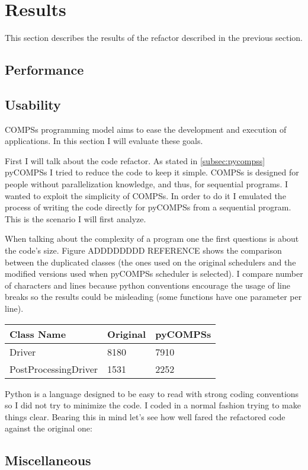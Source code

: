 \chapter{Results}


This section describes the results of the refactor described in the previous section. 
\section{Performance}



\section{Usability}

COMPSs programming model aims to ease the development and execution of applications. In this section I will evaluate these goals.

First I will talk about the code refactor. As stated in \ref{subsec:pycompss} pyCOMPSs I tried to reduce the code to keep it simple. COMPSs is designed for people without parallelization knowledge, and thus, for sequential programs. I wanted to exploit the simplicity of COMPSs. In order to do it I emulated the process of writing the code directly for pyCOMPSs from a sequential program. This is the scenario I will first analyze.

When talking about the complexity of a program one the first questions is about the code's size. Figure ADDDDDDDD REFERENCE shows the comparison between the duplicated classes (the ones used on the original schedulers and the modified versions used when pyCOMPSs scheduler is selected). I compare number of characters and lines because python conventions encourage the usage of line breaks so the results could be misleading (some functions have one parameter per line).


\begin{center}
	\begin{tabular}{| R{3cm} | C{3cm} | C{3cm} |}
		\hline
		Class Name & Original & pyCOMPSs \\ 
		\hline
		\hline
		Driver & 8180  &  7910 \\
		PostProcessingDriver & 1531 & 2252 \\
		
		\hline
	\end{tabular}
\end{center}


Python is a language designed to be easy to read with strong coding conventions so I did not try to minimize the code. I coded in a normal fashion trying to make things clear. Bearing this in mind let's see how well fared the refactored code against the original one:





\section{Miscellaneous}